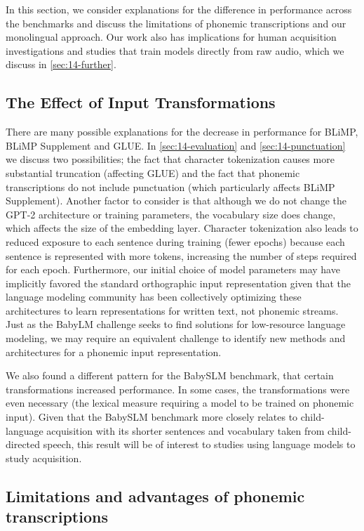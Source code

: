 In this section, we consider explanations for the difference in performance across the benchmarks and discuss the limitations of phonemic transcriptions and our monolingual approach. Our work also has implications for human acquisition investigations and studies that train models directly from raw audio, which we discuss in \cref{sec:14-further}.

\subsection{The Effect of Input Transformations}

There are many possible explanations for the decrease in performance for BLiMP, BLiMP Supplement and GLUE. In \cref{sec:14-evaluation} and \cref{sec:14-punctuation} we discuss two possibilities; the fact that character tokenization causes more substantial truncation (affecting GLUE) and the fact that phonemic transcriptions do not include punctuation (which particularly affects BLiMP Supplement). Another factor to consider is that although we do not change the GPT-2 architecture or training parameters, the vocabulary size does change, which affects the size of the embedding layer. Character tokenization also leads to reduced exposure to each sentence during training (fewer epochs) because each sentence is represented with more tokens, increasing the number of steps required for each epoch. Furthermore, our initial choice of model parameters may have implicitly favored the standard orthographic input representation given that the language modeling community has been collectively optimizing these architectures to learn representations for written text, not phonemic streams. Just as the BabyLM challenge seeks to find solutions for low-resource language modeling, we may require an equivalent challenge to identify new methods and architectures for a phonemic input representation. 

We also found a different pattern for the BabySLM benchmark, that certain transformations increased performance. In some cases, the transformations were even necessary (the lexical measure requiring a model to be trained on phonemic input). Given that the BabySLM benchmark more closely relates to child-language acquisition with its shorter sentences and vocabulary taken from child-directed speech, this result will be of interest to studies using language models to study acquisition.

\subsection{Limitations and advantages of phonemic transcriptions}
\label{sec:14-phonemeslimitations}

